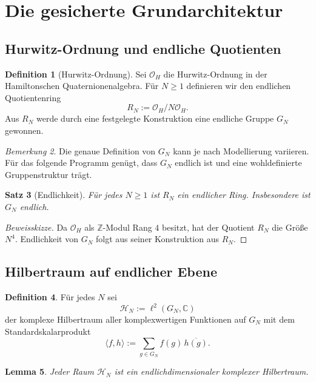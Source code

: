 \documentclass[12pt,a4paper]{article}
\theoremstyle{plain}
\newtheorem{satz}{Satz}[section]
\newtheorem{lemma}[satz]{Lemma}
\theoremstyle{definition}
\newtheorem{definition}[satz]{Definition}
\theoremstyle{remark}
\newtheorem{bemerkung}[satz]{Bemerkung}
\newcommand{\OH}{\mathcal O_H}
\newcommand{\HN}{\mathcal H_N}
\newcommand{\Cp}{\mathbb C}
\newcommand{\elltwo}{\ell^2}
\begin{document}
	\section{Die gesicherte Grundarchitektur}
	
	\subsection{Hurwitz-Ordnung und endliche Quotienten}
	
	\begin{definition}[Hurwitz-Ordnung]
		Sei \(\OH\) die Hurwitz-Ordnung in der Hamiltonschen Quaternionenalgebra. Für \(N\geq 1\)
		definieren wir den endlichen Quotientenring
		\[
		R_N := \OH / N\OH.
		\]
		Aus \(R_N\) werde durch eine festgelegte Konstruktion eine endliche Gruppe \(G_N\) gewonnen.
	\end{definition}
	
	\begin{bemerkung}
		Die genaue Definition von \(G_N\) kann je nach Modellierung variieren. Für das folgende
		Programm genügt, dass \(G_N\) endlich ist und eine wohldefinierte Gruppenstruktur trägt.
	\end{bemerkung}
	
	\begin{satz}[Endlichkeit]
		Für jedes \(N\geq 1\) ist \(R_N\) ein endlicher Ring. Insbesondere ist \(G_N\) endlich.
	\end{satz}
	
	\begin{proof}[Beweisskizze]
		Da \(\OH\) als \(\mathbb Z\)-Modul Rang \(4\) besitzt, hat der Quotient \(R_N\) die Größe
		\(N^4\). Endlichkeit von \(G_N\) folgt aus seiner Konstruktion aus \(R_N\).
	\end{proof}
	
	\subsection{Hilbertraum auf endlicher Ebene}
	
	\begin{definition}
		Für jedes \(N\) sei
		\[
		\HN := \elltwo(G_N,\Cp)
		\]
		der komplexe Hilbertraum aller komplexwertigen Funktionen auf \(G_N\) mit dem Standardskalarprodukt
		\[
		\langle f,h\rangle := \sum_{g\in G_N} f(g)\,\overline{h(g)}.
		\]
	\end{definition}
	
	\begin{lemma}
		Jeder Raum \(\HN\) ist ein endlichdimensionaler komplexer Hilbertraum.
	\end{lemma}
	
\end{document}
